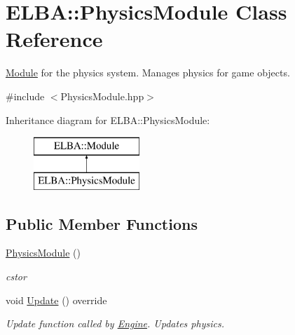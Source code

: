 \hypertarget{class_e_l_b_a_1_1_physics_module}{}\section{E\+L\+BA\+:\+:Physics\+Module Class Reference}
\label{class_e_l_b_a_1_1_physics_module}


\mbox{\hyperlink{class_e_l_b_a_1_1_module}{Module}} for the physics system. Manages physics for game objects.  




{\ttfamily \#include $<$Physics\+Module.\+hpp$>$}

Inheritance diagram for E\+L\+BA\+:\+:Physics\+Module\+:\begin{figure}[H]
\begin{center}
\leavevmode
\includegraphics[height=2.000000cm]{class_e_l_b_a_1_1_physics_module}
\end{center}
\end{figure}
\subsection*{Public Member Functions}
\begin{DoxyCompactItemize}
\item 
\mbox{\label{class_e_l_b_a_1_1_physics_module_a6e9a7c32219eca4a49d371164ea30891}} 
\mbox{\hyperlink{class_e_l_b_a_1_1_physics_module_a6e9a7c32219eca4a49d371164ea30891}{Physics\+Module}} ()
\begin{DoxyCompactList}\small\item\em cstor \end{DoxyCompactList}\item 
\mbox{\label{class_e_l_b_a_1_1_physics_module_ac28a5c8d369cb387a460af370c8cc4f7}} 
void \mbox{\hyperlink{class_e_l_b_a_1_1_physics_module_ac28a5c8d369cb387a460af370c8cc4f7}{Update}} () override
\begin{DoxyCompactList}\small\item\em Update function called by \mbox{\hyperlink{class_e_l_b_a_1_1_engine}{Engine}}. Updates physics. \end{DoxyCompactList}\end{DoxyCompactItemize}


